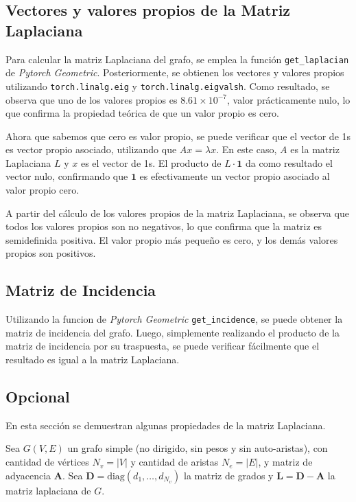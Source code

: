 \documentclass{article}
\begin{document}
\subsection{Vectores y valores propios de la Matriz Laplaciana}
Para calcular la matriz Laplaciana del grafo, se emplea la función \verb|get_laplacian| de \textit{Pytorch Geometric}. Posteriormente, se obtienen los vectores y valores propios utilizando \verb|torch.linalg.eig| y \verb|torch.linalg.eigvalsh|. Como resultado, se observa que uno de los valores propios es $8.61 \times 10^{-7}$, valor prácticamente nulo, lo que confirma la propiedad teórica de que un valor propio es cero.

Ahora que sabemos que cero es valor propio, se puede verificar que el vector de 1s es vector propio asociado, utilizando que $Ax = \lambda x$. En este caso, $A$ es la matriz Laplaciana $L$ y $x$ es el vector de 1s. El producto de $L \cdot \mathbf{1}$ da como resultado el vector nulo, confirmando que $\mathbf{1}$ es efectivamente un vector propio asociado al valor propio cero.

A partir del cálculo de los valores propios de la matriz Laplaciana, se observa que todos los valores propios son no negativos, lo que confirma que la matriz es semidefinida positiva. El valor propio más pequeño es cero, y los demás valores propios son positivos.

\subsection{Matriz de Incidencia}
Utilizando la funcion de \textit{Pytorch Geometric} \verb|get_incidence|, se puede obtener la matriz de incidencia del grafo. Luego, simplemente realizando el producto de la matriz de incidencia por su traspuesta, se puede verificar fácilmente que el resultado es igual a la matriz Laplaciana.

\subsection{Opcional} \label{subsec:opcional}
En esta sección se demuestran algunas propiedades de la matriz Laplaciana.

\newcommand{\ones}[1]{\mathbb{1}_{#1}}
\newcommand{\lap}{\mathbf{L}}
\newcommand{\diag}{\mathbf{D}}
\newcommand{\adj}{\mathbf{A}}
\newcommand{\bm}{\tilde{\mathbf{B}}}
\newcommand{\x}{\mathbf{x}}

Sea $G(V,E)$ un grafo simple (no dirigido, sin pesos y sin auto-aristas), con cantidad de vértices $N_v = |V|$ y cantidad de aristas $N_e = |E|$, y matriz de adyacencia $\mathbf{A}$. Sea $\mathbf{D} = \text{diag}(d_{1},\dots, d_{N_v})$ la matriz de grados y $\mathbf{L}=\mathbf{D}- \mathbf{A}$ la matriz laplaciana de $G$.
\end{document}
